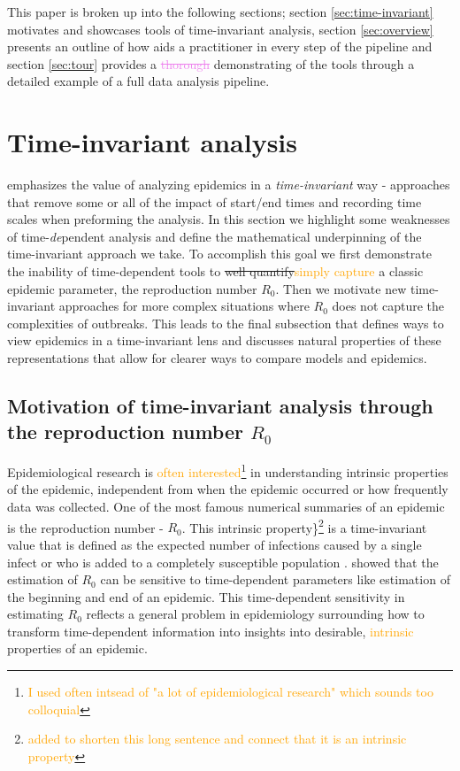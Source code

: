 \documentclass[
  shortnames]{jss}
\begin{document}
This paper is broken up into the following sections; section
\ref{sec:time-invariant} motivates and showcases tools of time-invariant
analysis, section \ref{sec:overview} presents an outline of how
 aids a practitioner in every step of the pipeline and
section \ref{sec:tour} provides a \textcolor{violet}{\sout{thorough}}
demonstrating of the tools through a detailed example of a full data
analysis pipeline.

\hypertarget{time-invariant-analysis}{%
\section{Time-invariant analysis}\label{time-invariant-analysis}}

 emphasizes the value of analyzing epidemics in a
\textit{time-invariant} way - approaches that remove some or all of the
impact of start/end times and recording time scales when preforming the
analysis. In this section we highlight some weaknesses of
time-\textit{de}pendent analysis and define the mathematical
underpinning of the time-invariant approach we take. To accomplish this
goal we first demonstrate the inability of time-dependent tools to
\sout{well quantify}\textcolor{orange}{simply capture} a classic
epidemic parameter, the reproduction number \(R_0\). Then we motivate
new time-invariant approaches for more complex situations where \(R_0\)
does not capture the complexities of outbreaks. This leads to the final
subsection that defines ways to view epidemics in a time-invariant lens
and discusses natural properties of these representations that allow for
clearer ways to compare models and epidemics.

\subsection[Motivation through the reproduction number $R_0$]{Motivation
of time-invariant analysis through the reproduction number
\(R_0\)}\label{sec:r0_subsection}

Epidemiological research is
\textcolor{orange}{often interested}\footnote{\textcolor{orange}{I used often intsead of "a lot of epidemiological research" which sounds too colloquial}}
in understanding intrinsic properties of the epidemic, independent from
when the epidemic occurred or how frequently data was collected. One of
the most famous numerical summaries of an epidemic is the reproduction
number - \(R_0\). \textcolor{orange}{} This intrinsic
property\}\footnote{\textcolor{orange}{added to shorten this long sentence and connect that it is an intrinsic property}}
is a time-invariant value that is defined as the expected number of
infections caused by a single infect or who is added to a completely
susceptible population \citep{anderson1992}. \citet{Gallagher2020}
showed that the estimation of \(R_0\) can be sensitive to time-dependent
parameters like estimation of the beginning and end of an epidemic. This
time-dependent sensitivity in estimating \(R_0\) reflects a general
problem in epidemiology surrounding how to transform time-dependent
information into insights into desirable, \textcolor{orange}{intrinsic}
properties of an epidemic.
\end{document}
